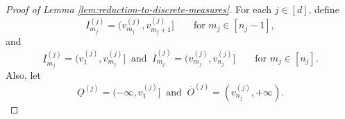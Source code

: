 \documentclass[10pt]{article}
\begin{document}
\begin{proof}[Proof of Lemma \ref{lem:reduction-to-discrete-measures}]
For each $j \in [d]$, define
\begin{equation*}
    I^{(j)}_{m_j} = (v^{(j)}_{m_j}, v^{(j)}_{m_j + 1}] 
    \qquad \text{for } m_j \in [n_j - 1],
\end{equation*}
and
\begin{equation*}
    \underline{I}^{(j)}_{m_j} = (v^{(j)}_{1}, v^{(j)}_{m_j}]
    \ \text{ and } \
    \overline{I}^{(j)}_{m_j} = (v^{(j)}_{m_j}, v^{(j)}_{n_j}]
    \qquad \text{for } m_j \in [n_j].
\end{equation*}
Also, let
\begin{equation*}
    \underline{O}^{(j)} = (-\infty, v^{(j)}_{1}]
    \ \text{ and } \
    \overline{O}^{(j)} = (v^{(j)}_{n_j}, +\infty).
\end{equation*}


\end{proof}
\end{document}

